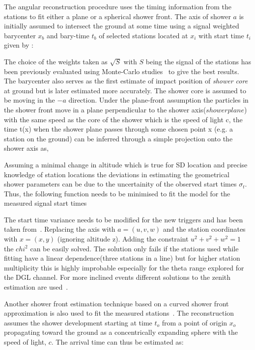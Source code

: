 The angular reconstruction procedure uses the timing information from the stations to fit either a plane or a spherical shower front. The axis of shower $a$ is initially assumed to intersect the ground at some time using a signal weighted barycenter $x_b$ and bary-time $t_b$ of selected stations located at $x_i$ with start time $t_i$ given by :




The choice of the weights taken as $\sqrt{S} $ with $S$ being the signal of the stations has been previously evaluated using Monte-Carlo studies~\cite{} to give the best results. The barycenter also serves as the first estimate of impact position of \textit{shower core} at ground but is later estimated more accurately. The shower core is assumed to be moving in the $-a$ direction. Under the plane-front assumption the particles in the shower front move in a plane perpendicular to the shower axis($shower plane$) with the same speed as the core of the shower which is the speed of light c, the time t(x) when the shower plane passes through some chosen point
x (e.g. a station on the ground) can be inferred through a simple projection onto the shower axis as,


Assuming a minimal change in altitude which is true for SD location and precise knowledge of station locations the deviations in estimating the geometrical shower parameters can be due to the uncertainity of the observed start times $\sigma_t$. Thus, the following function needs to be minimised to fit the model for the measured signal start times 


The start time variance needs to be modified for the new triggers and has been taken from~\cite{}. Replacing the axis with $a =(u,v,w)$ and the station coordinates with $x = (x,y)$ (ignoring altitude z). Adding the constraint $u^2 + v^2 + w^2 = 1$ the $chi^2$ can be easily solved. The solution only fails if the stations used while fitting have a linear dependence(three stations in a line) but for higher station multiplicity this is highly improbable especially for the theta range explored for the DGL channel. For more inclined events different solutions to the zenith estimation are used~\cite{}. 
 
Another shower front estimation technique based on a curved shower front approximation is also used to fit the measured stations~\cite{}. The reconstruction assumes the shower development starting at time $t_o$ from a point of origin $x_o$ propagating toward the ground as a concentrically expanding sphere with the speed of light, $c$. The arrival time can thus be estimated as:


